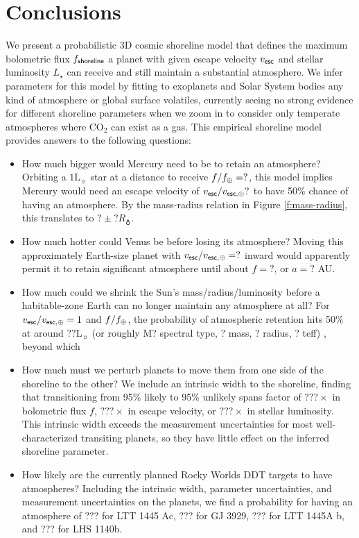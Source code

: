 \documentclass[modern,linenumbers,trackchanges]{aastex7}
\newcommand{\todo}[1]{{\color{orange}  #1 \normalfont}}
\begin{document}
\section{Conclusions}
\label{s:conclusions}

We present a probabilistic 3D cosmic shoreline model that defines the maximum bolometric flux $f_{\sf shoreline}$ a planet with given escape velocity $v_{\sf esc}$ and stellar luminosity $L_\star$ can receive and still maintain a substantial atmosphere. We infer parameters for this model by fitting to exoplanets and Solar System bodies any kind of atmosphere or global surface volatiles, currently seeing no strong evidence for different shoreline parameters when we zoom in to consider only temperate atmospheres where CO$_2$ can exist as a gas. This empirical shoreline model provides answers to the following questions:
\begin{itemize}
\item How much bigger would Mercury need to be to retain an atmosphere? Orbiting a $1\mathrm{L_\sun}$ star at a distance to receive $f/f_\oplus = ? $, this model implies Mercury would need an escape velocity of $v_{\sf esc}/v_{\sf esc, \oplus} ?$ to have 50\% chance of having an atmosphere. By the mass-radius relation in Figure \ref{f:mass-radius}, this translates to $? \pm ?R_\earth$. 

\item How much hotter could Venus be before losing its atmosphere? Moving this approximately Earth-size planet with $v_{\sf esc}/v_{\sf esc, \oplus} = ?$ inward would apparently permit it to retain significant atmosphere until about $f = ?$, or $a = ?$ AU.

\item How much could we shrink the Sun's mass/radius/luminosity before a habitable-zone Earth can no longer maintain any atmosphere at all? For $v_{\sf esc}/v_{\sf esc, \oplus} = 1$ and $f/f_\oplus$, the probability of atmospheric retention hits 50\% at around $?? \mathrm{L_\sun}$ \todo{(or roughly M? spectral type, ? mass, ? radius, ? teff)}, beyond which 

\item How much must we perturb planets to move them from one side of the shoreline to the other? We include an intrinsic width to the shoreline, finding that transitioning from 95\% likely to 95\% unlikely spans factor of $???\times$ in bolometric flux $f$, $???\times$ in escape velocity, or $???\times$ in stellar luminosity. This intrinsic width exceeds the measurement uncertainties for most well-characterized transiting planets, so they have little effect on the inferred shoreline parameter.

\item How likely are the currently planned Rocky Worlds DDT targets to have atmospheres? Including the intrinsic width, parameter uncertainties, and measurement uncertainties on the planets, we find a probability for having an atmosphere of ??? for LTT 1445 Ac, ??? for  GJ 3929, ??? for LTT 1445A b, and ??? for LHS 1140b.
\end{itemize}
\end{document}
